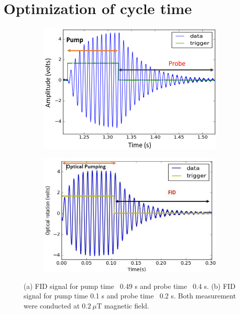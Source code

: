    \section{Optimization of cycle time} 
   \begin{figure}
    \centering
 
    \begin{subfigure}[b]{0.425\textwidth}
        \centering
        \includegraphics[width=\textwidth]{figures/Capture}
        \caption{}
        \label{fig:pump short}
    \end{subfigure}
    \hfill
    \begin{subfigure}[b]{0.42\textwidth}
        \centering
        \includegraphics[width=\textwidth]{figures/Capture2}
        \caption{}
        \label{fig:pump long}
    \end{subfigure}
    \caption{(a) FID signal for pump time~ 0.49 s and probe time~ 0.4 s. (b) FID signal for pump time  0.1 s and probe time ~0.2 s. Both measurement were conducted at $0.2~\mu$T magnetic field.}
    \label{fig:three graphs}
\end{figure} 
